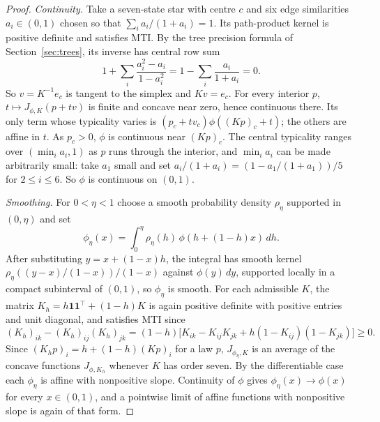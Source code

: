 \documentclass[11pt,a4paper]{article}
\theoremstyle{remark}
\newcommand{\one}{\mathbf 1}
\begin{document}
\begin{proof}
\emph{Continuity.} Take a seven-state star with centre $c$ and six edge similarities $a_i\in(0,1)$ chosen so that $\sum_i a_i/(1+a_i)=1$. Its path-product kernel is positive definite and satisfies MTI. By the tree precision formula of Section~\ref{sec:trees}, its inverse has central row sum
\[
 1+\sum_i\frac{a_i^2-a_i}{1-a_i^2}=1-\sum_i\frac{a_i}{1+a_i}=0.
\]
So $v=K^{-1}e_c$ is tangent to the simplex and $Kv=e_c$. For every interior $p$, $t\mapsto J_{\phi,K}(p+tv)$ is finite and concave near zero, hence continuous there. Its only term whose typicality varies is $(p_c+tv_c)\phi((Kp)_c+t)$; the others are affine in $t$. As $p_c>0$, $\phi$ is continuous near $(Kp)_c$. The central typicality ranges over $(\min_i a_i,1)$ as $p$ runs through the interior, and $\min_ia_i$ can be made arbitrarily small: take $a_1$ small and set $a_i/(1+a_i)=(1-a_1/(1+a_1))/5$ for $2\le i\le6$. So $\phi$ is continuous on $(0,1)$.

\emph{Smoothing.} For $0<\eta<1$ choose a smooth probability density $\rho_\eta$ supported in $(0,\eta)$ and set
\[
 \phi_\eta(x)=\int_0^\eta
     \rho_\eta(h)\,\phi(h+(1-h)x)\,dh .
\]
After substituting $y=x+(1-x)h$, the integral has smooth kernel $\rho_\eta((y-x)/(1-x))/(1-x)$ against $\phi(y)\,dy$, supported locally in a compact subinterval of $(0,1)$, so $\phi_\eta$ is smooth. For each admissible $K$, the matrix $K_h=h\one\one^\top+(1-h)K$ is again positive definite with positive entries and unit diagonal, and satisfies MTI since
\[
 (K_h)_{ik}-(K_h)_{ij}(K_h)_{jk}
 =(1-h)\big[K_{ik}-K_{ij}K_{jk}
           +h(1-K_{ij})(1-K_{jk})\big]\ge0 .
\]
Since $(K_hp)_i=h+(1-h)(Kp)_i$ for a law $p$, $J_{\phi_\eta,K}$ is an average of the concave functions $J_{\phi,K_h}$ whenever $K$ has order seven. By the differentiable case each $\phi_\eta$ is affine with nonpositive slope. Continuity of $\phi$ gives $\phi_\eta(x)\to\phi(x)$ for every $x\in(0,1)$, and a pointwise limit of affine functions with nonpositive slope is again of that form.
\end{proof}
\end{document}
